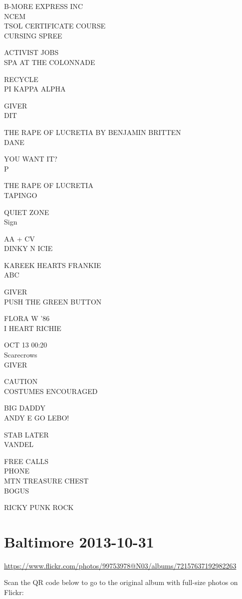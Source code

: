 \documentclass[10pt,letterpaper]{article}
\begin{document}
B{-}MORE EXPRESS INC\\
NCEM\\
TSOL CERTIFICATE COURSE\\
CURSING SPREE

ACTIVIST JOBS\\
SPA AT THE COLONNADE

RECYCLE\\
PI KAPPA ALPHA

GIVER\\
DIT

THE RAPE OF LUCRETIA BY BENJAMIN BRITTEN\\
DANE

YOU WANT IT?\\
P

THE RAPE OF LUCRETIA\\
TAPINGO

QUIET ZONE\\
Sign

AA + CV\\
DINKY N ICIE

KAREEK HEARTS FRANKIE\\
ABC

GIVER\\
PUSH THE GREEN BUTTON

FLORA W '86\\
I HEART RICHIE

OCT 13 00:20\\
Scarecrows\\
GIVER

CAUTION\\
COSTUMES ENCOURAGED

BIG DADDY\\
ANDY E GO LEBO!

STAB LATER\\
VANDEL

FREE CALLS\\
PHONE\\
MTN TREASURE CHEST\\
BOGUS

RICKY PUNK ROCK
\pagebreak

\section*{Baltimore 2013-10-31}

\url{https://www.flickr.com/photos/99753978@N03/albums/72157637192982263}

Scan the QR code below to go to the original album with full-size photos on Flickr:
\end{document}
